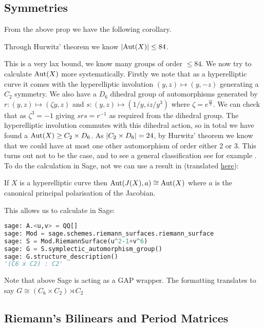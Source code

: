 \documentclass{article}
\begin{document}
\subsection{Symmetries}
From the above prop we have the following corollary.
\begin{corollary}
	Through Hurwitz' theorem we know $\left\lvert \operatorname{Aut}(X) \right\rvert \leq 84$.
\end{corollary}
This is a very lax bound, we know many groups of order $\leq 84$. We now try to calculate $\operatorname{Aut}(X)$ more systematically. Firstly we note that as a hyperelliptic curve it comes with the hyperelliptic involution $(y,z) \mapsto(y,-z)$ generating a $C_2$ symmetry. We also have a $D_6$ dihedral group of automorphisms generated by $r:(y,z) \mapsto (\zeta y, z)$ and $s:(y,z) \mapsto (1/y,iz/y^3)$ where $\zeta = e^{\frac{i\pi}{3}}$. We can check that as $\zeta^3=-1$ 
giving $srs=r^{-1}$ as required from the dihedral group. The hyperelliptic involution commutes with this dihedral action, so in total we have found a $\operatorname{Aut}(X) \geq C_2 \times D_6$. As $\left\lvert C_2 \times D_6 \right\rvert=24$, by Hurwitz' theorem we know that we could have at most one other automorphism of order either 2 or 3. This turns out not to be the case, and to see a general classification see for example \cite{Muller2017}. \\
To do the calculation in Sage, not we can use a result in \cite{Lauter2001} (translated \href{https://www.arxiv-vanity.com/papers/1811.07007/}{here}):
\begin{lemma}
	If $X$ is a hyperelliptic curve then $\operatorname{Aut}(J(X),a) \cong \operatorname{Aut}(X)$ where $a$ is the canonical principal polarisation of the Jacobian. 
\end{lemma}
This allows us to calculate in Sage:
\begin{lstlisting}[language=Python,frame=single]
sage: A.<u,v> = QQ[]
sage: Mod = sage.schemes.riemann_surfaces.riemann_surface
sage: S = Mod.RiemannSurface(u^2-1+v^6)
sage: G = S.symplectic_automorphism_group()
sage: G.structure_description()
'(C6 x C2) : C2'
\end{lstlisting}
\begin{remark}
	Note that above Sage is acting as a GAP wrapper. The formatting translates to say $G \cong (C_6 \times C_2) \rtimes C_2$
\end{remark}

\subsection{Riemann's Bilinears and Period Matrices}
\end{document}
